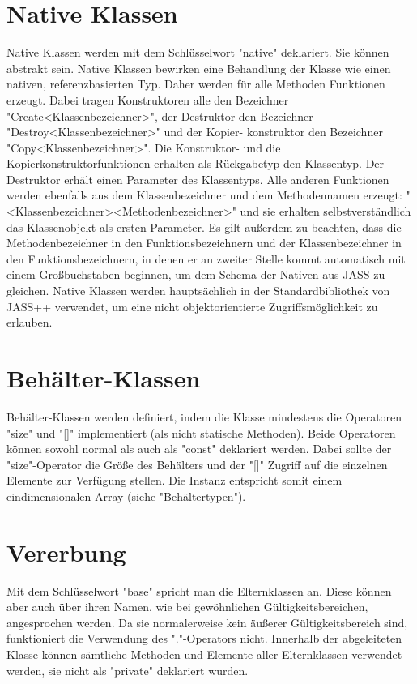 \section{Native Klassen}
Native Klassen werden mit dem Schlüsselwort "native" deklariert. Sie können abstrakt sein.
Native Klassen bewirken eine Behandlung der Klasse wie einen nativen, referenzbasierten Typ.
Daher werden für alle Methoden Funktionen erzeugt. Dabei tragen Konstruktoren alle den Bezeichner
"Create<Klassenbezeichner>", der Destruktor den Bezeichner "Destroy<Klassenbezeichner>" und der Kopier-
konstruktor den Bezeichner "Copy<Klassenbezeichner>".
Die Konstruktor- und die Kopierkonstruktorfunktionen erhalten als Rückgabetyp den Klassentyp.
Der Destruktor erhält einen Parameter des Klassentyps.
Alle anderen Funktionen werden ebenfalls aus dem Klassenbezeichner und dem Methodennamen erzeugt:
"<Klassenbezeichner><Methodenbezeichner>" und sie erhalten selbstverständlich das Klassenobjekt als
ersten Parameter.
Es gilt außerdem zu beachten, dass die Methodenbezeichner in den Funktionsbezeichnern und der Klassenbezeichner in den
Funktionsbezeichnern, in denen er an zweiter Stelle kommt automatisch mit einem Großbuchstaben beginnen,
um dem Schema der Nativen aus JASS zu gleichen.
Native Klassen werden hauptsächlich in der Standardbibliothek von JASS++ verwendet, um eine nicht objektorientierte
Zugriffsmöglichkeit zu erlauben.

\section{Behälter-Klassen}
Behälter-Klassen werden definiert, indem die Klasse mindestens die Operatoren "size" und "[]" implementiert (als nicht statische Methoden).
Beide Operatoren können sowohl normal als auch als "const" deklariert werden.
Dabei sollte der "size"-Operator die Größe des Behälters und der "[]" Zugriff auf die einzelnen Elemente zur Verfügung stellen.
Die Instanz entspricht somit einem eindimensionalen Array (siehe "Behältertypen").

\section{Vererbung}
Mit dem Schlüsselwort "base" spricht man die Elternklassen an. Diese können aber auch über ihren Namen, wie bei gewöhnlichen
Gültigkeitsbereichen, angesprochen werden. Da sie normalerweise kein äußerer Gültigkeitsbereich sind, funktioniert die Verwendung des "."-Operators nicht.
Innerhalb der abgeleiteten Klasse können sämtliche Methoden und Elemente aller Elternklassen verwendet werden, sie nicht als "private" deklariert wurden.

